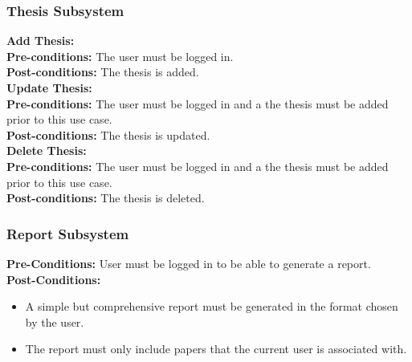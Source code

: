 \documentclass{article}
\begin{document}
			\subsubsection{Thesis Subsystem}
				\textbf{Add Thesis:}\\
					\indent \textbf{Pre-conditions:} The user must be logged in.\\
					\indent \textbf{Post-conditions:} The thesis is added.\\
				\textbf{Update Thesis:}\\
					\indent \textbf{Pre-conditions:} The user must be logged in and a the thesis must be added prior to this use case.\\
					\indent \textbf{Post-conditions:} The thesis is updated.\\
				\textbf{Delete Thesis:}\\
					\indent \textbf{Pre-conditions:} The user must be logged in and a the thesis must be added prior to this use case.\\
					\indent \textbf{Post-conditions:} The thesis is deleted.\\
			\subsubsection{Report Subsystem}
				\textbf{Pre-Conditions:} User must be logged in to be able to generate a report.\\
				\textbf{Post-Conditions:}
				\begin{itemize}
					\item A simple but comprehensive report must be generated in the format chosen by the user.
					\item The report must only include papers that the current user is associated with.
				\end{itemize}
\end{document}
